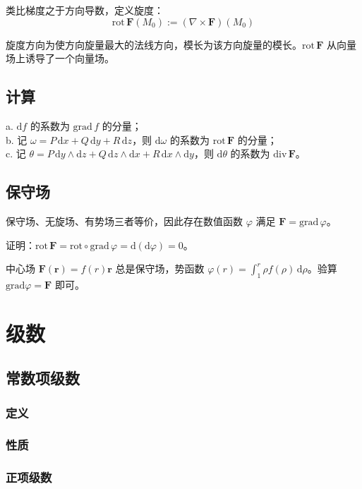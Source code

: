 \documentclass[12pt, a4paper, UTF8, openany]{ctexbook}
\newcommand{\dif}{\mathrm{d}}
\newcommand{\sdif}{\,\dif}
\newcommand{\mat}[1]{\mathbf{#1}}
\newcommand{\grad}{\mathrm{grad}}
\newcommand{\rot}{\mathrm{rot}}
\newcommand{\grads}{\mathrm{grad}\,}
\newcommand{\divfs}{\mathrm{div}\,}
\newcommand{\rots}{\mathrm{rot}\,}
\begin{document}
        类比梯度之于方向导数，定义旋度：
        $$\rots \mat{F}(M_0) := (\nabla \times \mat{F})(M_0)$$

        旋度方向为使方向旋量最大的法线方向，模长为该方向旋量的模长。$\rots \mat{F}$ 从向量场上诱导了一个向量场。

    \section{计算}
    a. $\dif f$ 的系数为 $\grads f$ 的分量；\\
    b. 记 $\omega = P\sdif x + Q\sdif y + R\sdif z$，则 $\dif\omega$ 的系数为 $\rots \mat{F}$ 的分量；\\
    c. 记 $\theta = P \sdif y \land \dif z + Q \sdif z \land \dif x + R \sdif x \land \dif y$，则 $\dif\theta$ 的系数为 $\divfs \mat{F}$。

    \section{保守场}
    保守场、无旋场、有势场三者等价，因此存在数值函数 $\varphi$ 满足 $\mat{F} = \grads \varphi$。

    证明：$\rots \mat{F} = \rot \circ \grads \varphi = \dif(\dif \varphi) = 0$。

    中心场 $\mat{F}(\mat{r}) = f(r)\mat{r}$ 总是保守场，势函数 $\varphi(r) = \int_{1}^{r} \rho f(\rho)\sdif\rho$。验算 $\grad \varphi = \mat{F}$ 即可。

    \chapter{级数}
    \section{常数项级数}
        \subsection{定义}

        \subsection{性质}

        \subsection{正项级数}
\end{document}
